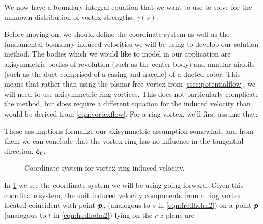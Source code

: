 \noindent We now have a boundary integral equation that we want to use to solve for the unknown distribution of vortex strengths, \(\gamma(s)\).



Before moving on, we should define the coordinate system as well as the fundamental boundary induced velocities we will be using to develop our solution method.
%
The bodies which we would like to model in our application are axisymmetric bodies of revolution (such as the center body) and annular airfoils (such as the duct comprised of a casing and nacelle) of a ducted rotor.
%
This means that rather than using the planar free vortex from \cref{ssec:potentialflow}, we will need to use axisymmetric ring vortices.
%
This does not particularly complicate the method, but does require a different equation for the induced velocity than would be derived from \cref{eqn:vortexflow}.
%
For a ring vortex, we'll first assume that:

\begin{assumption}{}
    \vspace*{-\baselineskip}
\end{assumption}

\begin{assumption}{}
    \label{asm:axisymmetric}
    \vspace*{-\baselineskip}
\end{assumption}
%
These assumptions formalize our axisymmetric assumption somewhat, and from them we can conclude that the vortex ring has no influence in the tangential direction, \(\hat{\bm{e}}_\theta\).

\begin{figure}[h!]
    \centering
        
        \caption{Coordinate system for vortex ring induced velocity.}
    \label{fig:vortexringgeom}
\end{figure}

In \cref{fig:vortexringgeom} we see the coordinate system we will be using going forward.
%
Given this coordinate system, the unit induced velocity components from a ring vortex located coincident with point \(\bm{p}_o\) (analogous to \(s\) in \cref{eqn:fredholm2}) on a point \(\bm{p}\) (analogous to \(t\) in \cref{eqn:fredholm2}) lying on the \(r\)-\(z\) plane are

